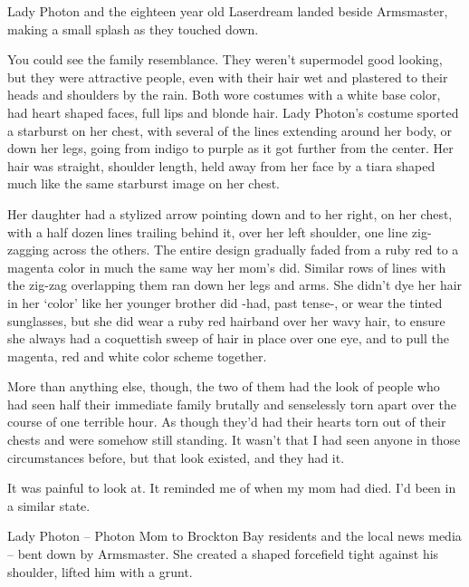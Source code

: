 





Lady Photon and the eighteen year old Laserdream landed beside Armsmaster, making a small splash as they touched down.



You could see the family resemblance.  They weren't supermodel good looking, but they were attractive people, even with their hair wet and plastered to their heads and shoulders by the rain.  Both wore costumes with a white base color, had heart shaped faces, full lips and blonde hair.  Lady Photon's costume sported a starburst on her chest, with several of the lines extending around her body, or down her legs, going from indigo to purple as it got further from the center.  Her hair was straight, shoulder length, held away from her face by a tiara shaped much like the same starburst image on her chest.



Her daughter had a stylized arrow pointing down and to her right, on her chest, with a half dozen lines  trailing behind it, over her left shoulder, one line zig-zagging across the others.  The entire design gradually faded from a ruby red to a magenta color in much the same way her mom's did.  Similar rows of lines with the zig-zag overlapping them ran down her legs and arms.  She didn't dye her hair in her `color' like her younger brother did -had, past tense-, or wear the tinted sunglasses, but she did wear a ruby red hairband over her wavy hair, to ensure she always had a coquettish sweep of hair in place over one eye, and to pull the magenta, red and white color scheme together.



More than anything else, though, the two of them had the look of people who had seen half their immediate family brutally and senselessly torn apart over the course of one terrible hour.  As though they'd had their hearts torn out of their chests and were somehow still standing.  It wasn't that I had seen anyone in those circumstances before, but that look existed, and they had it.



It was painful to look at.  It reminded me of when my mom had died.  I'd been in a similar state.



Lady Photon – Photon Mom to Brockton Bay residents and the local news media – bent down by Armsmaster.  She created a shaped forcefield tight against his shoulder, lifted him with a grunt.



